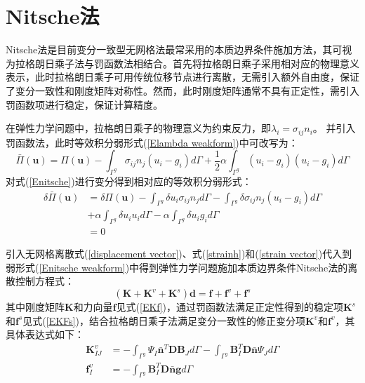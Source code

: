 \section{Nitsche法}
Nitsche法\cite{fernandez-mendez2004}是目前变分一致型无网格法最常采用的本质边界条件施加方法，其可视为拉格朗日乘子法与罚函数法相结合。首先将拉格朗日乘子采用相对应的物理意义表示，此时拉格朗日乘子可用传统位移节点进行离散，无需引入额外自由度，保证了变分一致性和刚度矩阵对称性。然而，此时刚度矩阵通常不具有正定性，需引入罚函数项进行稳定，保证计算精度。\par
在弹性力学问题中，拉格朗日乘子的物理意义为约束反力，即$\lambda_i=\sigma_{ij}n_i$。
并引入罚函数法，此时等效积分弱形式(\ref{Elambda weakform})中可改写为：
\begin{equation}\label{Enitsche}
    \bar{\Pi}(\pmb{u})=\Pi(\pmb{u})-\int_{\Gamma^g}\sigma_{ij}n_j(u_i-g_i)d\Gamma+\frac{1}{2}\alpha\int_{\Gamma^g}(u_i-g_i)(u_i-g_i)d\Gamma
\end{equation}
对式(\ref{Enitsche})进行变分得到相对应的等效积分弱形式：
\begin{equation}\label{Enitsche weakform}
\begin{split}
    \delta\bar{\Pi}(\pmb{u})&=\delta\Pi(\pmb{u})-\int_{\Gamma^g}\delta u_i\sigma_{ij}n_jd\Gamma-\int_{\Gamma^g}\delta\sigma_{ij}n_j(u_i-g_i)d\Gamma\\
    &+\alpha\int_{\Gamma^g}\delta u_iu_id\Gamma-\alpha\int_{\Gamma^g}\delta u_i g_id\Gamma\\
    &=0
\end{split}
\end{equation}\par
引入无网格离散式(\ref{displacement vector})、式(\ref{strainh})和(\ref{strain vector})代入到弱形式(\ref{Enitsche weakform})中得到弹性力学问题施加本质边界条件Nitsche法的离散控制方程式：
\begin{equation}
    (\pmb{K}+\pmb{K}^v+\pmb{K}^s)\pmb{d}=\pmb{f}+\pmb{f}^v+\pmb{f}^s
\end{equation}
其中刚度矩阵$\pmb{K}$和力向量$\pmb{f}$见式(\ref{EKf})，通过罚函数法满足正定性得到的稳定项$\pmb{K}^s$和$\pmb{f}^s$见式(\ref{EKFs})，结合拉格朗日乘子法满足变分一致性的修正变分项$\pmb{K}^v$和$\pmb{f}^v$，其具体表达式如下：
\begin{subequations}\label{Enitschekv}
\begin{align} 
    \pmb K^v_{IJ}&=-\int_{\Gamma^g}\Psi_I\bar{\pmb{n}}^T\pmb{D}\pmb{B}_Jd\Gamma-\int_{\Gamma^g}\pmb{B}_I^T\pmb{D}\bar{\pmb{n}}\Psi_Jd\Gamma\\
    \pmb f^v_I&=-\int_{\Gamma^g}\pmb{B}_I^T\pmb{D}\bar{\pmb{n}}\pmb{g}d\Gamma
\end{align}
\end{subequations}
